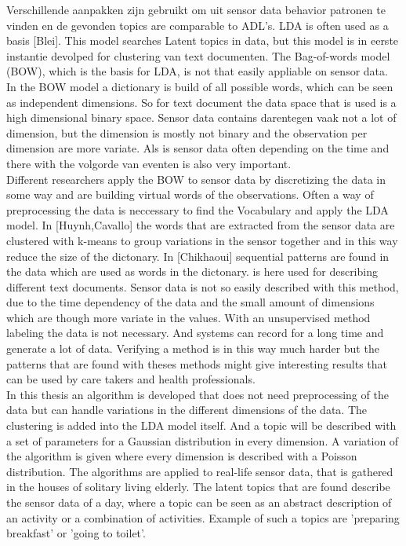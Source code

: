 Verschillende aanpakken zijn gebruikt om uit sensor data behavior patronen te vinden en de gevonden topics are comparable to ADL's. LDA is often used as a basis [Blei]. This model searches Latent topics in data, but this model is in eerste instantie devolped for clustering van text documenten. The Bag-of-words model (BOW), which is the basis for LDA, is not that easily appliable on sensor data. In the BOW model a dictionary is build of all possible words, which can be seen as independent dimensions. So for text document the data space that is used is a high dimensional binary space. Sensor data contains darentegen  vaak not a lot of dimension, but the dimension is mostly not binary and the observation per dimension are more variate. Als is sensor data often depending on the time and there with the volgorde van eventen is also very important.\\
Different researchers apply the BOW to sensor data by discretizing the data in some way and are building virtual words of the observations. Often a way of preprocessing the data is neccessary to find the Vocabulary and apply the LDA model. In [Huynh,Cavallo] the words that are extracted from the sensor data are clustered with k-means to group variations in the sensor together and in this way reduce the size of the dictonary. In [Chikhaoui] sequential patterns are found in the data which are used as words in the dictonary. 
 is here used for describing different text documents. Sensor data is not so easily described with this method, due to the time dependency of the data and the small amount of dimensions which are though more variate in the values. 
With an unsupervised method labeling the data is not necessary. And systems can record for a long time and generate a lot of data. Verifying a method is in this way much harder but the patterns that are found with theses methods might give interesting results that can be used by care takers and health professionals.\\

In this thesis an algorithm is developed that does not need preprocessing of the data but can handle variations in the different dimensions of the data. The clustering is added into the LDA model itself. And a topic will be described with a set of parameters for a Gaussian distribution in every dimension. A variation of the algorithm is given where every dimension is described with a Poisson distribution. The algorithms are applied to real-life sensor data, that is gathered in the houses of solitary living elderly. The latent topics that are found describe the sensor data of a day, where a topic can be seen as an abstract description of an activity or a combination of activities. Example of such a topics are 'preparing breakfast' or 'going to toilet'.\\

